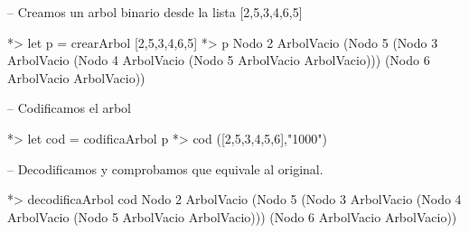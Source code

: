 \documentclass{article}
\begin{document}
-- Creamos un arbol binario desde la lista [2,5,3,4,6,5]

*> let p = crearArbol [2,5,3,4,6,5]
*> p
Nodo 2 ArbolVacio (Nodo 5 (Nodo 3 ArbolVacio (Nodo 4 ArbolVacio (Nodo 5 ArbolVacio ArbolVacio))) (Nodo 6 ArbolVacio ArbolVacio))


-- Codificamos el arbol

*> let cod = codificaArbol p
*> cod
([2,5,3,4,5,6],"1000")


-- Decodificamos y comprobamos que equivale al original.

*> decodificaArbol cod
Nodo 2 ArbolVacio (Nodo 5 (Nodo 3 ArbolVacio (Nodo 4 ArbolVacio (Nodo 5 ArbolVacio ArbolVacio))) (Nodo 6 ArbolVacio ArbolVacio))
\end{document}
